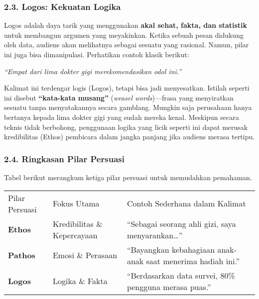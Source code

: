 \documentclass[
  letterpaper,
  DIV=11,
  numbers=noendperiod]{scrreprt}
\begin{document}
\subsubsection{2.3. Logos: Kekuatan Logika}\label{logos-kekuatan-logika}

Logos adalah daya tarik yang menggunakan \textbf{akal sehat, fakta, dan
statistik} untuk membangun argumen yang meyakinkan. Ketika sebuah pesan
didukung oleh data, audiens akan melihatnya sebagai sesuatu yang
rasional. Namun, pilar ini juga bisa dimanipulasi. Perhatikan contoh
klasik berikut:

\emph{``Empat dari lima dokter gigi merekomendasikan odol ini.''}

Kalimat ini terdengar logis (Logos), tetapi bisa jadi menyesatkan.
Istilah seperti ini disebut \textbf{``kata-kata musang''} (\emph{weasel
words})---frasa yang menyiratkan sesuatu tanpa menyatakannya secara
gamblang. Mungkin saja perusahaan hanya bertanya kepada lima dokter gigi
yang sudah mereka kenal. Meskipun secara teknis tidak berbohong,
penggunaan logika yang licik seperti ini dapat merusak kredibilitas
(Ethos) pembicara dalam jangka panjang jika audiens merasa tertipu.

\subsubsection{2.4. Ringkasan Pilar
Persuasi}\label{ringkasan-pilar-persuasi}

Tabel berikut merangkum ketiga pilar persuasi untuk memudahkan
pemahaman.

\begin{longtable}[]{@{}
  >{\raggedright\arraybackslash}p{}
  >{\raggedright\arraybackslash}p{}
  >{\raggedright\arraybackslash}p{}@{}}
\toprule\noalign{}
\endhead
\bottomrule\noalign{}
\endlastfoot
Pilar Persuasi & Fokus Utama & Contoh Sederhana dalam Kalimat \\
\textbf{Ethos} & Kredibilitas \& Kepercayaan & ``Sebagai seorang ahli
gizi, saya menyarankan\ldots{}'' \\
\textbf{Pathos} & Emosi \& Perasaan & ``Bayangkan kebahagiaan anak-anak
saat menerima hadiah ini.'' \\
\textbf{Logos} & Logika \& Fakta & ``Berdasarkan data survei, 80\%
pengguna merasa puas.'' \\
\end{longtable}
\end{document}
